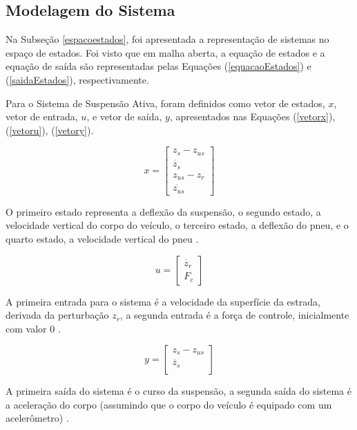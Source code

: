 \documentclass[journal,brazil,english]{IEEEtran}
\begin{document}
\subsection{Modelagem do Sistema}\label{modelagem1}
Na Subseção \ref{espacoestados}, foi apresentada a representação de sistemas no espaço de estados. Foi visto que em malha aberta, a equação de estados e a equação de saída são representadas pelas Equações (\ref{equacaoEstados}) e (\ref{saidaEstados}), respectivamente.

Para o Sistema de Suspensão Ativa, foram definidos como vetor de estados, $x$, vetor de entrada, $u$, e vetor de saída, $y$, apresentados nas Equações (\ref{vetorx}), (\ref{vetoru}), (\ref{vetory}).

\begin{equation}\label{vetorx}
x=\left[ \begin{matrix}
z_s-z_{us} \\
\dot{z_s} \\
z_{us}-z_r \\
\dot{z_{us}}
\end{matrix} \right]
\end{equation}

O primeiro estado representa a deflexão da suspensão, o segundo estado, a velocidade vertical do corpo do veículo, o terceiro estado, a deflexão do pneu, e o quarto estado, a velocidade vertical do pneu \cite{quanser}.

\begin{equation}\label{vetoru}
u=\left[\begin{matrix}
\dot{z_r} \\
F_c
\end{matrix}\right]
\end{equation}

A primeira entrada para o sistema é a velocidade da superfície da estrada, derivada da perturbação $z_r$, a segunda entrada é a força de controle, inicialmente com valor $0$ \cite{quanser}.

\begin{equation}\label{vetory}
y=\left[\begin{matrix}
z_s-z_{us} \\
\ddot{z_s} \\
\end{matrix}\right]
\end{equation}

A primeira saída do sistema é o curso da suspensão, a segunda saída do sistema é a aceleração do corpo (assumindo que o corpo do veículo é equipado com um acelerômetro) \cite{quanser}.
\end{document}
